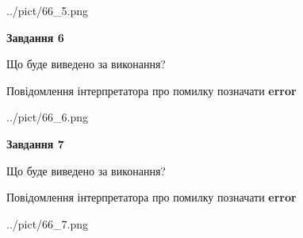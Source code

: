 \documentclass[10pt, ukrainian]{article}
\begin{document}
{\begin {large}
\begin{center}
	{../pict/66_5.png}
\end{center}
\newpage

{\begin {center}\textbf{Завдання 6}\end {center}}\par
Що буде виведено за виконання? \par
Повідомлення інтерпретатора про помилку позначати \textbf{error}

\begin{center}
	{../pict/66_6.png}
\end{center}
\newpage

{\begin {center}\textbf{Завдання 7}\end {center}}\par
Що буде виведено за виконання? \par
Повідомлення інтерпретатора про помилку позначати \textbf{error}

\begin{center}
	{../pict/66_7.png}
\end{center}
\newpage

\end {large}}
\end{document}
